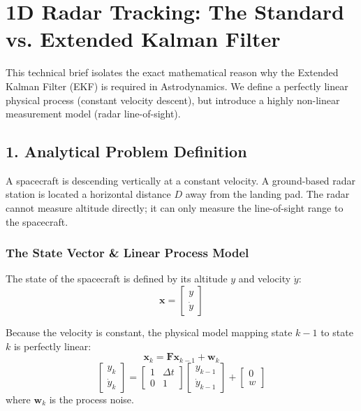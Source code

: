 \documentclass[11pt, letterpaper]{article}
\begin{document}
\section*{1D Radar Tracking: The Standard vs. Extended Kalman Filter}

This technical brief isolates the exact mathematical reason why the Extended Kalman Filter (EKF) is required in Astrodynamics. We define a perfectly linear physical process (constant velocity descent), but introduce a highly non-linear measurement model (radar line-of-sight).

\subsection*{1. Analytical Problem Definition}

A spacecraft is descending vertically at a constant velocity. A ground-based radar station is located a horizontal distance $D$ away from the landing pad. The radar cannot measure altitude directly; it can only measure the line-of-sight range to the spacecraft.

\subsubsection*{The State Vector \& Linear Process Model}
The state of the spacecraft is defined by its altitude $y$ and velocity $\dot{y}$:
\begin{equation}
\mathbf{x} = \begin{bmatrix} y \\ \dot{y} \end{bmatrix}
\end{equation}

Because the velocity is constant, the physical model mapping state $k-1$ to state $k$ is perfectly linear:
\begin{equation}
\mathbf{x}_{k} = \mathbf{F} \mathbf{x}_{k-1} + \mathbf{w}_{k}
\end{equation}
\begin{equation}
\begin{bmatrix} y_k \\ \dot{y}_k \end{bmatrix} = \begin{bmatrix} 1 & \Delta t \\ 0 & 1 \end{bmatrix} \begin{bmatrix} y_{k-1} \\ \dot{y}_{k-1} \end{bmatrix} + \begin{bmatrix} 0 \\ w \end{bmatrix}
\end{equation}
where $\mathbf{w}_k$ is the process noise.
\end{document}
